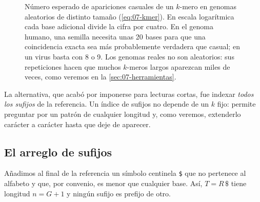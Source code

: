 \begin{figure}[tbp]
\centering
{}
\caption[Especificidad de una semilla frente a su longitud]{Número esperado de apariciones casuales de un $k$-mero en genomas aleatorios de distinto tamaño (\cref{eq:07-kmer}). En escala logarítmica cada base adicional divide la cifra por cuatro. En el genoma humano, una semilla necesita unas 20 bases para que una coincidencia exacta sea más probablemente verdadera que casual; en un virus basta con 8 o 9. Los genomas reales no son aleatorios: sus repeticiones hacen que muchos $k$-meros largos aparezcan miles de veces, como veremos en la \cref{sec:07-herramientas}.}
\label{fig:07-kmer}
\end{figure}

La alternativa, que acabó por imponerse para lecturas cortas, fue indexar \emph{todos los sufijos} de la referencia. Un índice de sufijos no depende de un $k$ fijo: permite preguntar por un patrón de cualquier longitud y, como veremos, extenderlo carácter a carácter hasta que deje de aparecer.

\subsection{El arreglo de sufijos}

Añadimos al final de la referencia un símbolo centinela \texttt{\$} que no pertenece al alfabeto y que, por convenio, es menor que cualquier base. Así, $T=R\,\texttt{\$}$ tiene longitud $n=G+1$ y ningún sufijo es prefijo de otro.

